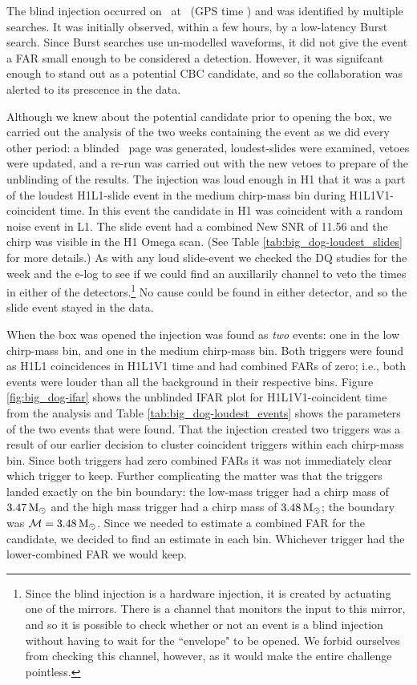 The blind injection occurred on \dogDate~at \injectedDogTime~(GPS time
\injectedDogGPSTime) and was identified by multiple searches. It was initially
observed, within a few hours, by a low-latency Burst search. Since Burst
searches use un-modelled waveforms, it did not give the event a \ac{FAR} small
enough to be considered a detection. However, it was signifcant enough to stand
out as a potential \ac{CBC} candidate, and so the collaboration was alerted to
its prescence in the data.

Although we knew about the potential candidate prior to opening the box, we
carried out the analysis of the two weeks containing the event as we did every
other period: a blinded \ihope~page was generated, loudest-slides were
examined, vetoes were updated, and a re-run was carried out with the new vetoes
to prepare of the unblinding of the results. The injection was loud enough in
H1 that it was a part of the loudest H1L1-slide event in the medium chirp-mass
bin during H1L1V1-coincident time. In this event the candidate in H1 was
coincident with a random noise event in L1. The slide event had a combined New
\ac{SNR} of 11.56 and the chirp was visible in the H1 Omega scan. (See Table
\ref{tab:big_dog-loudest_slides} for more details.) As with any loud
slide-event we checked the \ac{DQ} studies for the week and the e-log to see if
we could find an auxillarily channel to veto the times in either of the
detectors.\footnote{Since the blind injection is a hardware injection, it is
created by actuating one of the mirrors. There is a channel that monitors the
input to this mirror, and so it is possible to check whether or not an event is
a blind injection without having to wait for the ``envelope" to be opened. We
forbid ourselves from checking this channel, however, as it would make the
entire challenge pointless.} No cause could be found in either detector, and so
the slide event stayed in the data.

When the box was opened the injection was found as \emph{two} events: one in
the low chirp-mass bin, and one in the medium chirp-mass bin. Both triggers
were found as H1L1 coincidences in H1L1V1 time and had combined \acp{FAR} of
zero; i.e., both events were louder than all the background in their respective
bins. Figure \ref{fig:big_dog-ifar} shows the unblinded IFAR plot for
H1L1V1-coincident time from the analysis and Table
\ref{tab:big_dog-loudest_events} shows the parameters of the two events that
were found. That the injection created two triggers was a result of our earlier
decision to cluster coincident triggers within each chirp-mass bin. Since both
triggers had zero combined \acp{FAR} it was not immediately clear which trigger
to keep. Further complicating the matter was that the triggers landed exactly
on the bin boundary: the low-mass trigger had a chirp mass of $3.47\,\mathrm{M_\odot}$ and
the high mass trigger had a chirp mass of $3.48\,\mathrm{M_\odot}$; the boundary was
$\mathcal{M} = 3.48\,\mathrm{M_\odot}$. Since we needed to estimate a combined \ac{FAR} for
the candidate, we decided to find an estimate in each bin. Whichever trigger had
the lower-combined \ac{FAR} we would keep.

